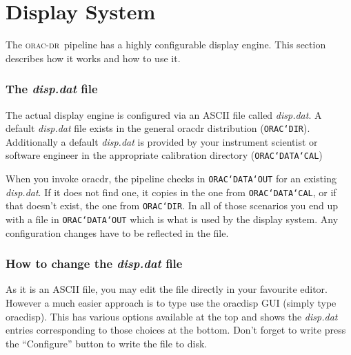 \documentclass[twoside,11pt]{article}
\newcommand{\xlabel}[1]{}
\renewcommand{\_}{\texttt{\symbol{95}}}
\def\C++{{\rm C\kern-.05em\raise.3ex\hbox{\footnotesize ++}}}
\newcommand{\underscore}{\_}
\newcommand{\oracdr}{\textsc{orac-dr}}
\begin{document}

\section{Display System\xlabel{display_system}}

The \oracdr\ pipeline has a highly configurable display engine. This
section describes how it works and how to use it.

\subsubsection*{The {\em disp.dat\/} file}

The actual display engine is configured via an ASCII file called
{\em disp.dat\/}. A default {\em disp.dat\/} file exists in the general oracdr
distribution ({\tt ORAC\char`\_DIR}). Additionally a default {\em disp.dat\/} is provided
by your instrument scientist or software engineer in the appropriate
calibration directory ({\tt ORAC\char`\_DATA\char`\_CAL})

When you invoke oracdr, the pipeline checks in {\tt ORAC\char`\_DATA\char`\_OUT} for an
existing {\em disp.dat\/}. If it does not find one, it copies in the one from
{\tt ORAC\char`\_DATA\char`\_CAL}, or if that doesn't exist, the one from {\tt ORAC\char`\_DIR}. In
all of those scenarios you end up with a file in {\tt ORAC\char`\_DATA\char`\_OUT} which
is what is used by the display system. Any configuration changes have
to be reflected in the file.

\subsubsection*{How to change the {\em disp.dat\/} file}

As it is an ASCII file, you may edit the file directly in your
favourite editor. However a much easier approach is to type use the
oracdisp GUI (simply type oracdisp). This has various options
available at the top and shows the {\em disp.dat\/} entries corresponding to
those choices at the bottom. Don't forget to write press the
``Configure'' button to write the file to disk. 
\end{document}
